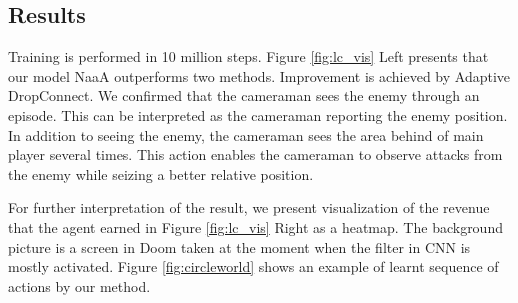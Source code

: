 \subsection{Results}
Training is performed in 10 million steps.
Figure \ref{fig:lc_vis} Left presents that our model NaaA outperforms two methods.
Improvement is achieved by Adaptive DropConnect.
We confirmed that the cameraman sees the enemy through an episode.
This can be interpreted as the cameraman reporting the enemy position.
In addition to seeing the enemy, the cameraman sees the area behind of main player several times.
This action enables the cameraman to observe attacks from the enemy while seizing a better relative position.

For further interpretation of the result, 
we present visualization of the revenue that the agent earned in Figure \ref{fig:lc_vis} Right as a heatmap.
The background picture is a screen in Doom taken at the moment when the filter in CNN is mostly activated.
Figure \ref{fig:circleworld} shows an example of learnt sequence of actions by our method.

